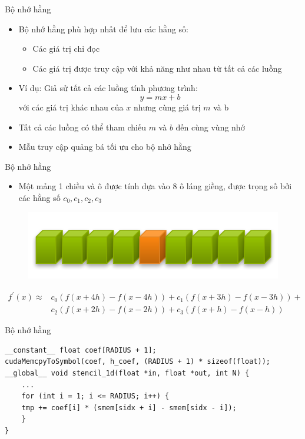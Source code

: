 \documentclass[10pt]{beamer}
\theoremstyle{remark}
\numberwithin{algocf}{section}
\numberwithin{equation}{section}
\numberwithin{dl}{section}
\numberwithin{figure}{section}
\begin{document}
\begin{frame}{Bộ nhớ hằng}
    \begin{itemize}
        \item Bộ nhớ hằng phù hợp nhất để lưu các hằng số:
        \begin{itemize}
            \item Các giá trị chỉ đọc 
            \item Các giá trị được truy cập với khả năng như nhau từ tất cả các luồng
        \end{itemize}
        \item Ví dụ: Giả sử tất cả các luồng tính phương trình:
        \begin{equation*}
            y = m x + b
        \end{equation*}
        với các giá trị khác nhau của $x$ nhưng cùng giá trị $m$ và b
        \item Tất cả các luồng có thể tham chiếu $m$ và $b$ đến cùng vùng nhớ
        \item Mẫu truy cập quảng bá tối ưu cho bộ nhớ hằng
    \end{itemize}
\end{frame}

\begin{frame}{Bộ nhớ hằng}
    \begin{itemize}
        \item Một mảng 1 chiều và ô được tính dựa vào 8 ô láng giềng, được trọng số bởi các hằng số $c_0, c_1, c_2, c_3$
    \end{itemize}
    \begin{figure}[H]
        \centering
        \includegraphics[width=0.5\linewidth]{figures/CUDA/1d_Stencil.png}
    \end{figure}
    \begin{equation*}
        \begin{aligned}
            f^{\prime}(x) \approx &c_0 (f(x + 4h) - f(x - 4h)) + c_1 (f(x + 3h) - f(x - 3h)) + \\ 
            &c_2 (f(x + 2h) - f(x - 2h)) + c_3 (f(x + h) - f(x - h))
        \end{aligned}
    \end{equation*}
\end{frame}

\begin{frame}[fragile]{Bộ nhớ hằng}
    \begin{verbatim}
__constant__ float coef[RADIUS + 1];
cudaMemcpyToSymbol(coef, h_coef, (RADIUS + 1) * sizeof(float));
__global__ void stencil_1d(float *in, float *out, int N) {
    ...
    for (int i = 1; i <= RADIUS; i++) {
    tmp += coef[i] * (smem[sidx + i] - smem[sidx - i]);
    }
} 
    \end{verbatim}
\end{frame}
\end{document}
